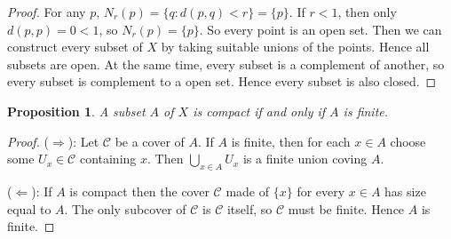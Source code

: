\documentclass[12pt]{article}
\newtheorem*{prop}{Proposition}
\theoremstyle{remark}
\theoremstyle{named}
\renewcommand{\implies}{\Rightarrow}
\newcommand{\coimplies}{\Leftarrow}
\begin{document}
\begin{proof}
    For any $p$, $N_r(p) = \{q : d(p, q) < r\} = \{p\}$. If $r < 1$, then only $d(p, p) = 0 < 1$, so $N_r(p) = \{p\}$. So every point is an open set. Then we can construct every subset of $X$ by taking suitable unions of the points. Hence all subsets are open. At the same time, every subset is a complement of another, so every subset is complement to a open set. Hence every subset is also closed. 
\end{proof}

\begin{prop}
    A subset $A$ of $X$ is compact if and only if $A$ is finite.
\end{prop}

\begin{proof}
    ($\implies$): Let $\mathcal C$ be a cover of $A$. If $A$ is finite, then for each $x \in A$ choose some $U_x \in \mathcal C$ containing $x$. Then $\bigcup_{x \in A} U_x$ is a finite union coving $A$.

    ($\coimplies$): If $A$ is compact then the cover $\mathcal C$ made of $\{x\}$ for every $x \in A$ has size equal to $A$. The only subcover of $\mathcal C$ is $\mathcal C$ itself, so $\mathcal C$ must be finite. Hence $A$ is finite.
\end{proof}
\end{document}
